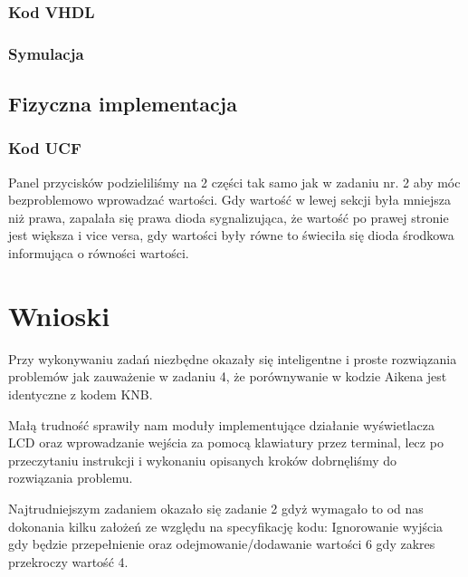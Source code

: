 \documentclass[a4paper,12pt]{extarticle}  %
\begin{document}
\subsubsection{Kod VHDL}

\subsubsection{Symulacja}
\begin{figure}[H]
   \centering
\end{figure}
\subsection{Fizyczna implementacja}
\subsubsection{Kod UCF}


Panel przycisków podzieliliśmy na 2 części tak samo jak w zadaniu nr. 2 aby móc bezproblemowo wprowadzać wartości.
Gdy wartość w lewej sekcji była mniejsza niż prawa, zapalała się prawa dioda sygnalizująca, że wartość po prawej stronie jest większa i vice versa, gdy wartości były równe to świeciła się dioda środkowa informująca o równości wartości.
\section{Wnioski}
Przy wykonywaniu zadań niezbędne okazały się inteligentne i proste rozwiązania problemów jak zauważenie w zadaniu 4, że porównywanie w kodzie Aikena jest identyczne z kodem KNB.

Małą trudność sprawiły nam moduły implementujące działanie wyświetlacza LCD oraz wprowadzanie wejścia za pomocą klawiatury przez terminal, lecz po przeczytaniu instrukcji i wykonaniu opisanych kroków dobrnęliśmy do rozwiązania problemu.

Najtrudniejszym zadaniem okazało się zadanie 2 gdyż wymagało to od nas dokonania kilku założeń ze względu na specyfikację kodu:
Ignorowanie wyjścia gdy będzie przepełnienie oraz odejmowanie/dodawanie wartości 6 gdy zakres przekroczy wartość 4.
\end{document}
